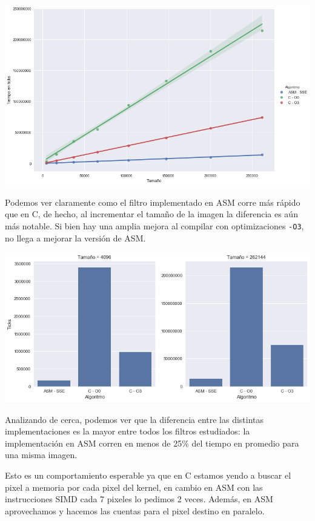 \begin{center}
	\includegraphics[scale=0.5]{img/maxCloser_CvsASMvsO3.png}
\end{center}

Podemos ver claramente como el filtro implementado en ASM corre más rápido que en C, de hecho, al incrementar el tamaño de la imagen la diferencia es aún más notable. Si bien hay una amplia mejora al compilar con optimizaciones \texttt{-O3}, no llega a mejorar la versión de ASM.

\begin{center}
	\includegraphics[scale=0.5]{img/maxCloser_CvsASMvsO3_bars.png}
\end{center}

Analizando de cerca, podemos ver que la diferencia entre las distintas implementaciones es la mayor entre todos los filtros estudiados: la implementación en ASM corren en menos de 25\% del tiempo en promedio para una misma imagen.

Esto es un comportamiento esperable ya que en C estamos yendo a buscar el pixel a memoria por cada pixel del kernel, en cambio en ASM con las instrucciones SIMD cada 7 pixeles lo pedimos 2 veces. Además, en ASM aprovechamos y hacemos las cuentas para el pixel destino en paralelo.

